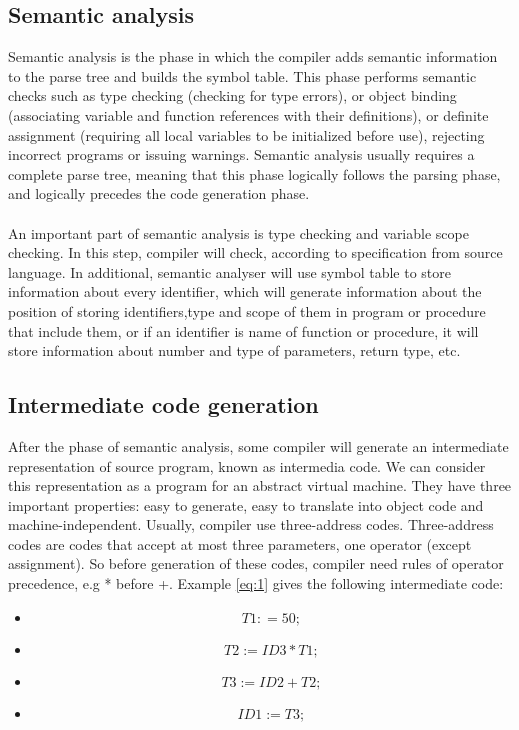 \documentclass[12pt, a4paper]{report}
\begin{document}
			\subsection{Semantic analysis}
				\tab Semantic analysis is the phase in which the compiler adds semantic information to the parse tree and builds the symbol table. This phase performs semantic checks such as type checking (checking for type errors), or object binding (associating variable and function references with their definitions), or definite assignment (requiring all local variables to be initialized before use), rejecting incorrect programs or issuing warnings. Semantic analysis usually requires a complete parse tree, meaning that this phase logically follows the parsing phase, and logically precedes the code generation phase.\\ \\
				\tab An important part of semantic analysis is type checking and variable scope checking. In this step, compiler will check, according to specification from source language. In additional, semantic analyser will use symbol table to store information about every identifier, which will generate information about the position of storing identifiers,type  and scope of them in program or procedure that include them, or if an identifier is name of function or procedure, it will store information about number and type of parameters, return type, etc.
			\subsection{Intermediate code generation}
				\tab After the phase of semantic analysis, some compiler will generate an intermediate representation of source program, known as intermedia code. We can consider this representation as a program for an abstract virtual machine. They have three important properties: easy to generate, easy to translate into object code and machine-independent. Usually, compiler use three-address codes. Three-address codes are codes that accept at most three parameters, one operator (except assignment). So before generation of these codes, compiler need rules of operator precedence, e.g * before +. Example \ref{eq:1} gives the following intermediate code:
				\begin{itemize}
					\item[] $$T1: = 50;$$
					\item[] $$T2:= ID3 * T1;$$
					\item[] $$T3 := ID2 + T2;$$
					\item[] $$ID1:= T3;$$
				\end{itemize}
\end{document}
